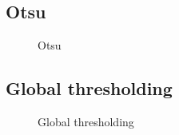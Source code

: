 \pagebreak

\subsection{Otsu}

    \begin{figure}[!htb]\centering
        \begin{minipage}{0.6\textwidth}
            \caption{\small{Otsu}}\label{diagram:otsu}
        \end{minipage}
    \end{figure}

\subsection{Global thresholding}

    \begin{figure}[!htb]\centering
        \begin{minipage}{0.6\textwidth}
            \caption{\small{Global thresholding}}\label{diagram:gthresholding}
        \end{minipage}
    \end{figure}


